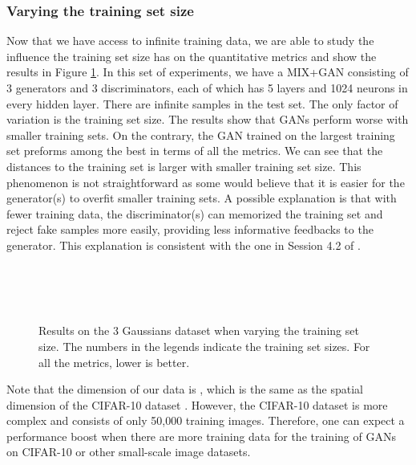 \documentclass[conference]{IEEEtran}
\begin{document}
\subsubsection{Varying the training set size}
Now that we have access to infinite training data, we are able to study the influence the training set size has on the quantitative metrics and show the results in Figure \ref{setsize_comp_quant}. In this set of experiments, we have a MIX+GAN consisting of 3 generators and 3 discriminators, each of which has 5 layers and 1024 neurons in every hidden layer. There are infinite samples in the test set. The only factor of variation is the training set size. The results show that GANs perform worse with smaller training sets. On the contrary, the GAN trained on the largest training set preforms among the best in terms of all the metrics. We can see that the distances to the training set is larger with smaller training set size. This phenomenon is not straightforward as some would believe that it is easier for the generator(s) to overfit smaller training sets. A possible explanation is that with fewer training data, the discriminator(s) can memorized the training set and reject fake samples more easily, providing less informative feedbacks to the generator. This explanation is consistent with the one in Session 4.2 of \cite{biggan}.

\begin{figure}[!h]
	\begin{center}
		\\
		\\
		\\
	\end{center}
	\caption{Results on the 3 Gaussians dataset when varying the training set size. The numbers in the legends indicate the training set sizes. For all the metrics, lower is better.}
	\label{setsize_comp_quant}
\end{figure}

Note that the dimension of our data is , which is the same as the spatial dimension of the CIFAR-10 dataset \cite{CIFAR10}. However, the CIFAR-10 dataset is more complex and consists of only 50,000 training images. Therefore, one can expect a performance boost when there are more training data for the training of GANs on CIFAR-10 or other small-scale image datasets.
\end{document}
